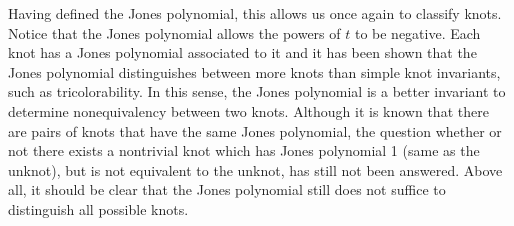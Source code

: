 \documentclass[12pt]{article}
\theoremstyle{definition}
\begin{document}
\noindent Having defined the Jones polynomial, this allows us once again to classify knots. Notice that the Jones polynomial allows the powers of $t$ to be negative. Each knot has a Jones polynomial associated to it and it has been shown that the Jones polynomial distinguishes between more knots than simple knot invariants, such as tricolorability. In this sense, the Jones polynomial is a better invariant to determine nonequivalency between two knots. Although it is known that there are pairs of knots that have the same Jones polynomial, the question whether or not there exists a nontrivial knot which has Jones polynomial 1 (same as the unknot), but is not equivalent to the unknot, has still not been answered. Above all, it should be clear that the Jones polynomial still does not suffice to distinguish all possible knots.

\end{document}
